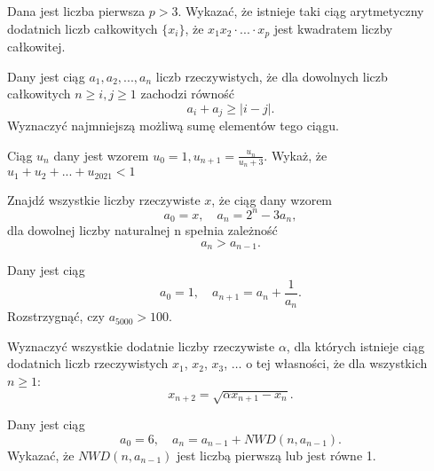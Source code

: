 \begin{problem}{1}
	Dana jest liczba pierwsza $p>3$. Wykazać, że istnieje taki ciąg arytmetyczny dodatnich liczb całkowitych $\{x_i\}$, że $x_1x_2\cdot ... \cdot x_p$ jest kwadratem liczby całkowitej.
\end{problem}


\begin{problem}{2}
	Dany jest ciąg $a_1, a_2, ..., a_n$ liczb rzeczywistych, że dla dowolnych liczb całkowitych $n \geqslant i, j \geqslant 1$ zachodzi równość
	\[
		a_i + a_j \geqslant |i - j|.
	\]
	Wyznaczyć najmniejszą możliwą sumę elementów tego ciągu.
\end{problem}

\begin{problem}{3}
	Ciąg ${u_n}$ dany jest wzorem $u_0=1, u_{n+1}=\frac{u_n}{u_n+3}$. Wykaż, że $ u_1+u_2+...+u_{2021}<1$
\end{problem}


\begin{problem}{4}
	Znajdź wszystkie liczby rzeczywiste $x$, że ciąg dany wzorem
	\[
		a_0 = x, \quad a_n = 2^n - 3a_n,
	\]
	dla dowolnej liczby naturalnej n spełnia zależność
	\[
		a_{n} > a_{n - 1}.
	\]
\end{problem}


\begin{problem}{5}
	Dany jest ciąg
	\[
		a_0 = 1, \quad a_{n + 1} = a_n + \frac{1}{a_n}.
	\]
	Rozstrzygnąć, czy $a_{5000} > 100$.
\end{problem}

\begin{problem}{6}
	Wyznaczyć wszystkie dodatnie liczby rzeczywiste $\alpha$, dla których istnieje ciąg dodatnich liczb rzeczywistych $x_1$, $x_2$, $x_3$, $\dots$ o tej własności, że dla wszystkich $n\geqslant 1$:
	\[
		x_{n+2} = \sqrt{\alpha x_{n+1} - x_n}.
	\]
\end{problem}

\begin{problem}{7}
	Dany jest ciąg
	\[
		a_0 = 6, \quad a_n = a_{n - 1} + NWD(n, a_{n - 1}).
	\]
	Wykazać, że $NWD(n, a_{n - 1})$ jest liczbą pierwszą lub jest równe 1.
\end{problem}


